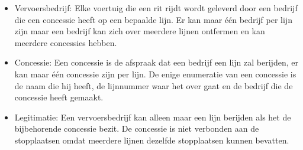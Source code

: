 \documentclass[a4paper]{scrartcl}
\begin{document}
\begin{itemize}
        \item Vervoersbedrijf: Elke voertuig die een rit rijdt wordt geleverd door een bedrijf die een concessie heeft op een bepaalde lijn. Er kan maar één bedrijf per lijn zijn maar een bedrijf kan zich over meerdere lijnen ontfermen en kan meerdere concessies hebben.

        \item Concessie: Een concessie is de afspraak dat een bedrijf een lijn zal berijden, er kan maar één concessie zijn per lijn. De enige enumeratie van een concessie is de naam die hij heeft, de lijnnummer waar het over gaat en de bedrijf die de concessie heeft gemaakt.

        \item Legitimatie: Een vervoersbedrijf kan alleen maar een lijn berijden als het de bijbehorende concessie bezit. De concessie is niet verbonden aan de stopplaatsen omdat meerdere lijnen dezelfde stopplaatsen kunnen bevatten.
    \end{itemize}
\end{document}
